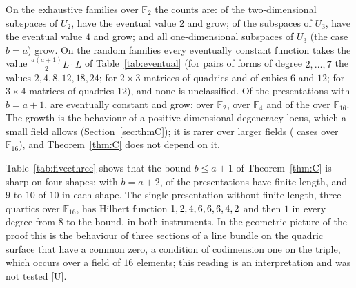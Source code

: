 \documentclass[11pt]{article}
\theoremstyle{definition}
\theoremstyle{remark}
\newcommand{\F}{\mathbb{F}}
\begin{document}
On the exhaustive families over $\F_2$ the counts are: of the \nfiveCoaCases{} two-dimensional subspaces of $U_2$, \nfiveCoaConst{} have the eventual value $2$ and \nfiveCoaGrow{} grow; of the \nfiveCobCases{} subspaces of $U_3$, \nfiveCobConst{} have the eventual value $4$ and \nfiveCobGrow{} grow; and all \nfiveCocCases{} one-dimensional subspaces of $U_3$ (the case $b=a$) grow. On the random families every eventually constant function takes the value $\tfrac{a(a+1)}2L\cdot L$ of Table~\ref{tab:eventual} (for pairs of forms of degree $2,\dots,7$ the values $2,4,8,12,18,24$; for $2\times3$ matrices of quadrics and of cubics $6$ and $12$; for $3\times4$ matrices of quadrics $12$), and none is unclassified. Of the \nfiveBaOne{} presentations with $b=a+1$, \nfiveConstant{} are eventually constant and \nfiveGrowing{} grow: \nfiveGrowGFtwo{} over $\F_2$, \nfiveGrowGFfour{} over $\F_4$ and \nfiveGrowGFsixteen{} of the \nfiveGFsixteenCases{} over $\F_{16}$. The growth is the behaviour of a positive-dimensional degeneracy locus, which a small field allows (Section~\ref{sec:thmC}); it is rarer over larger fields (\nfiveGrowGFsixteen{} cases over $\F_{16}$), and Theorem~\ref{thm:C} does not depend on it.

\begin{table}[htbp]
\centering\footnotesize

\caption{Presentations with $b=a+2$ relations of degree $e$ over $\F_{16}$, ten random draws per shape: with one relation more than the bound of Theorem~\ref{thm:C} the general presentation has finite length, so the bound is sharp on these four shapes.}
\label{tab:fivecthree}
\end{table}

Table~\ref{tab:fivecthree} shows that the bound $b\le a+1$ of Theorem~\ref{thm:C} is sharp on four shapes: with $b=a+2$, \nfiveCThreeFinite{} of the \nfiveCThreeCases{} presentations have finite length, and $9$ to $10$ of $10$ in each shape. The single presentation without finite length, three quartics over $\F_{16}$, has Hilbert function $1,2,4,6,6,6,4,2{}$ and then $1$ in every degree from $8$ to the bound, in both instruments. In the geometric picture of the proof this is the behaviour of three sections of a line bundle on the quadric surface that have a common zero, a condition of codimension one on the triple, which occurs over a field of $16$ elements; this reading is an interpretation and was not tested [U].

\begin{table}[htbp]
\centering\footnotesize

\caption{The modules $M_e=U/U(x^e,y^e)$ for $e=6,7$ over the rationals and every prime up to $31$, computed by both instruments: the fields with the pure table $(1,2,2,1)$ on $(0,e,3e,4e)$, the primes without it, and the number of fields at which the Betti tables of the two instruments are identical (those with finite length).}
\label{tab:fivecfour}
\end{table}
\end{document}
